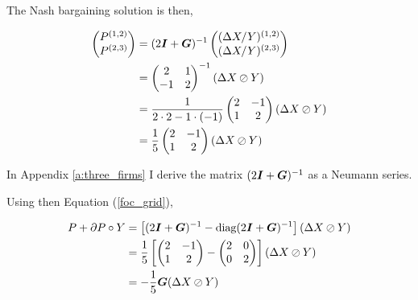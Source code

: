 The Nash bargaining solution is then,

\begin{equation*}
  \begin{split}
    \begin{pmatrix}
      P^{(1, 2)} \\
      P^{(2, 3)}
    \end{pmatrix} &= (2\bm{I} + \bm{G})^{-1} \begin{pmatrix}
      (\Delta X / Y)^{(1, 2)} \\
      (\Delta X / Y)^{(2, 3)}
    \end{pmatrix} \\
    &= \begin{pmatrix}
      2  & 1 \\
      -1 & 2
    \end{pmatrix}^{-1} (\Delta X \oslash Y)\\
    &= \frac{1}{2 \cdot 2 - 1 \cdot (-1)} \begin{pmatrix}
      2 & - 1 \\
      1 & 2
    \end{pmatrix} (\Delta X \oslash Y) \\
    &= \frac{1}{5} \begin{pmatrix}
      2 & - 1 \\
      1 & 2
    \end{pmatrix} (\Delta X \oslash Y)
  \end{split}
\end{equation*}

In Appendix \ref{a:three_firms} I derive the matrix $(2 \bm{I} + \bm{G})^{-1}$ as a Neumann series.

Using then Equation (\ref{foc_grid}),

\begin{equation}
  \begin{split}
    P + \partial P \circ Y &= \left[ (2 \bm{I} + \bm{G})^{-1} - \text{diag}(2 \bm{I} + \bm{G})^{-1}  \right] (\Delta X \oslash Y) \\
    &= \frac{1}{5} \left[ \begin{pmatrix}
        2 & - 1 \\
        1 & 2
      \end{pmatrix} -  \begin{pmatrix}
        2 & 0 \\
        0 & 2
      \end{pmatrix}\right] (\Delta X \oslash Y) \\
    &= -\frac{1}{5} \bm{G} (\Delta X \oslash Y)
  \end{split}
\end{equation}

